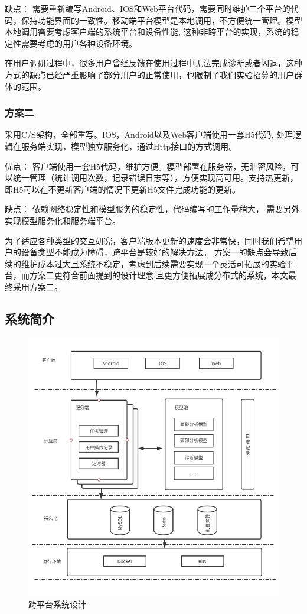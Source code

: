 缺点： 需要重新编写Android、IOS和Web平台代码，需要同时维护三个平台的代码，保持功能界面的一致性。移动端平台模型是本地调用，不方便统一管理。模型本地调用需要考虑客户端的系统平台和设备性能,
这种非跨平台的实现，系统的稳定性需要考虑的用户各种设备环境。

在用户调研过程中，很多用户曾经反馈在使用过程中无法完成诊断或者闪退，这种方式的缺点已经严重影响了部分用户的正常使用，也限制了我们实验招募的用户群体的范围。

\subsubsection{方案二}

采用C/S架构，全部重写。IOS，Android以及Web客户端使用一套H5代码, 处理逻辑在服务端实现，模型独立服务化，通过Http接口的方式调用。

优点： 客户端使用一套H5代码，维护方便。模型部署在服务器，无泄密风险，可以统一管理（统计调用次数，记录错误日志等），方便实现高可用。支持热更新，即H5可以在不更新客户端的情况下更新H5文件完成功能的更新。

缺点： 依赖网络稳定性和模型服务的稳定性，代码编写的工作量稍大， 需要另外实现模型服务化和服务端平台。

为了适应各种类型的交互研究，客户端版本更新的速度会非常快，同时我们希望用户的设备类型不能成为障碍，跨平台是较好的解决方法。
方案一的缺点会导致后续的维护成本过大且系统不稳定，考虑到后续需要实现一个灵活可拓展的实验平台，而方案二更符合前面提到的设计理念,且更方便拓展成分布式的系统，本文最终采用方案二。

\subsection{系统简介}
\begin{figure}[ht]
    \centering
    \includegraphics[width=15cm]{images/system2.png}
    \caption{跨平台系统设计}
    \label{fig:system}
\end{figure}


